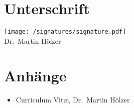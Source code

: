 \documentclass{scrartcl}
\begin{document}
\section{Unterschrift}

\texttt{[image: /signatures/signature.pdf]}\\
Dr.\ Martin H\"olzer

\section{Anhänge}
\begin{itemize}
  \item Curriculum Vit\ae, Dr.\ Martin H\"olzer
\end{itemize}
\end{document}
